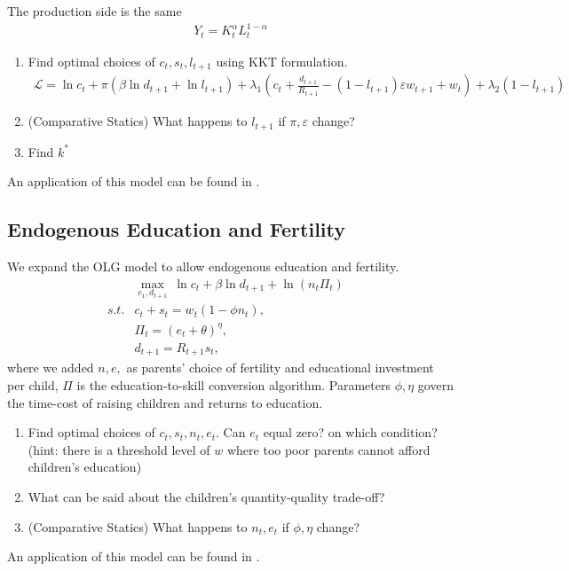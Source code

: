 \documentclass[10pt,a4paper]{book}
\theoremstyle{definition}\newtheorem{definition}{Definition}
\theoremstyle{definition}\newtheorem{fact}{Fact}
\theoremstyle{definition}\newtheorem{ex}{Ex.}
\theoremstyle{definition}\newtheorem{project}{Project}
\theoremstyle{definition}\newtheorem{problem}{Problem}
\theoremstyle{definition}\newtheorem{example}{Example}
\numberwithin{theorem}{chapter}
\numberwithin{corollary}{chapter}
\numberwithin{assumption}{chapter}
\numberwithin{definition}{chapter}
\numberwithin{prop}{chapter}
\numberwithin{notation}{chapter}
\numberwithin{problem}{chapter}
\numberwithin{example}{chapter}
\numberwithin{fact}{chapter}
\numberwithin{ex}{chapter}
\begin{document}
	The production side is the same
	\begin{align*}
		Y_t = K_t^\alpha L_t^{1-\alpha} 
	\end{align*}
	
	\begin{enumerate}
		\item Find optimal choices of $c_t, s_t, l_{t+1}$ using KKT formulation.
		\begin{align*}
			\mathcal{L} = \ln c_t + \pi ( \beta \ln d_{t+1} + \ln l_{t+1} ) + \lambda_1 (c_t + \frac{d_{t+1}}{R_{t+1}} - (1-l_{t+1}) \varepsilon w_{t+1} + w_t ) + \lambda_2 (1-l_{t+1}) 
		\end{align*}
		\item (Comparative Statics) What happens to $l_{t+1}$ if $\pi, \varepsilon$ change?
		\item Find $k^*$
	\end{enumerate}
	
	An application of this model can be found in \citet{TRAN2022101495}.
	
	\subsection{Endogenous Education and Fertility} 
	We expand the OLG model to allow endogenous education and fertility. 
	\begin{align*}
		& \max_{c_1, d_{t+1}} \ \ln c_t +  \beta \ln d_{t+1} + \ln (n_t \Pi_t) \\
		s.t. &c_t + s_t = w_t (1-\phi n_t), &                                                                      \\
		& \Pi_t = (e_t + \theta)^\eta,                                         \\
		& d_{t+1} = R_{t+1} s_t ,                                              
	\end{align*}
	where we added $n, e, $ as parents' choice of fertility and educational investment per child, $\Pi$ is the education-to-skill conversion algorithm. Parameters $\phi,\eta$ govern the time-cost of raising children and returns to education.
	\begin{enumerate}
		\item Find optimal choices of $c_t, s_t, n_t, e_t$. Can $e_t$ equal zero? on which condition? (hint: there is a threshold level of $w$ where too poor parents cannot afford children's education)
		\item What can be said about the children's quantity-quality trade-off?
		\item (Comparative Statics) What happens to $n_t, e_t$ if $\phi, \eta$ change?
	\end{enumerate}
	An application of this model can be found in \textcite{de2012fertility}.
	
\end{document}
